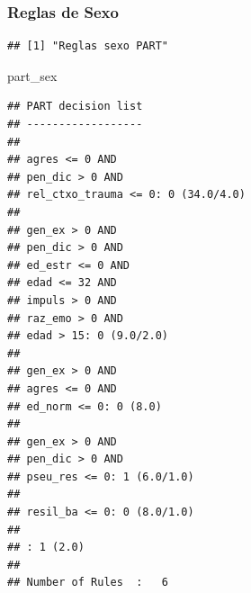 \documentclass[]{article}
\newenvironment{Shaded}{\begin{snugshade}}{\end{snugshade}}
\newcommand{\KeywordTok}[1]{\textcolor[rgb]{0.13,0.29,0.53}{\textbf{#1}}}
\newcommand{\DataTypeTok}[1]{\textcolor[rgb]{0.13,0.29,0.53}{#1}}
\newcommand{\StringTok}[1]{\textcolor[rgb]{0.31,0.60,0.02}{#1}}
\newcommand{\CommentTok}[1]{\textcolor[rgb]{0.56,0.35,0.01}{\textit{#1}}}
\newcommand{\OperatorTok}[1]{\textcolor[rgb]{0.81,0.36,0.00}{\textbf{#1}}}
\newcommand{\NormalTok}[1]{#1}
\begin{document}
\subsubsection{Reglas de Sexo}\label{reglas-de-sexo}

\begin{Shaded}
\end{Shaded}

\begin{verbatim}
## [1] "Reglas sexo PART"
\end{verbatim}

\begin{Shaded}
\begin{Highlighting}[]
\NormalTok{part_sex}
\end{Highlighting}
\end{Shaded}

\begin{verbatim}
## PART decision list
## ------------------
## 
## agres <= 0 AND
## pen_dic > 0 AND
## rel_ctxo_trauma <= 0: 0 (34.0/4.0)
## 
## gen_ex > 0 AND
## pen_dic > 0 AND
## ed_estr <= 0 AND
## edad <= 32 AND
## impuls > 0 AND
## raz_emo > 0 AND
## edad > 15: 0 (9.0/2.0)
## 
## gen_ex > 0 AND
## agres <= 0 AND
## ed_norm <= 0: 0 (8.0)
## 
## gen_ex > 0 AND
## pen_dic > 0 AND
## pseu_res <= 0: 1 (6.0/1.0)
## 
## resil_ba <= 0: 0 (8.0/1.0)
## 
## : 1 (2.0)
## 
## Number of Rules  :   6
\end{verbatim}
\end{document}
